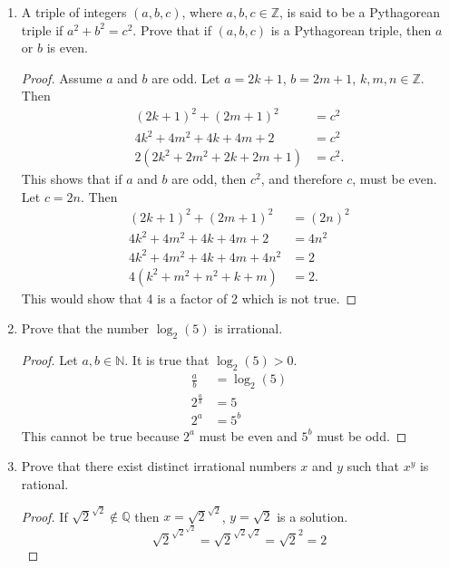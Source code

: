 \documentclass[12pt,a4paper,reqno,parskip=full]{amsart}
\numberwithin{equation}{section}
\theoremstyle{plain}
\theoremstyle{definition}
\begin{document}
\begin{enumerate}
  \item A triple of integers $(a,b,c)$, where $a,b,c\in\mathbb{Z}$, is said to be a Pythagorean triple if $a^2+b^2=c^2$. Prove that if $(a,b,c)$ is a Pythagorean triple, then $a$ or $b$ is even.
        \begin{proof}
          Assume $a$ and $b$ are odd. Let $a = 2k + 1$, $b = 2m + 1$, $k,m,n\in\mathbb{Z}$. Then
          \begin{align*}
            (2k + 1)^2 + (2m + 1)^2      & = c^2 \\
            4k^2 + 4m^2 + 4k + 4m + 2    & = c^2 \\
            2(2k^2 + 2m^2 + 2k + 2m + 1) & = c^2.
          \end{align*}
          This shows that if $a$ and $b$ are odd, then $c^2$, and therefore $c$, must be even. Let $c = 2n$. Then
          \begin{align*}
            (2k + 1)^2 + (2m + 1)^2    & = (2n)^2 \\
            4k^2 + 4m^2 + 4k + 4m + 2  & = 4n^2     \\
            4k^2 + 4m^2 + 4k + 4m + 4n^2 & = 2      \\
            4(k^2 + m^2 + n^2 + k + m)   & = 2.
          \end{align*}
          This would show that 4 is a factor of 2 which is not true.
        \end{proof}

  \item Prove that the number $\log_2(5)$ is irrational.
        \begin{proof}
          Let $a,b\in\mathbb{N}$. It is true that $\log_2(5) > 0$.
          \begin{align*}
            \frac{a}{b}     & =\log_2(5) \\
            2^{\frac{a}{b}} & = 5        \\
            2^a             & = 5^b
          \end{align*}
          This cannot be true because $2^a$ must be even and $5^b$ must be odd.
        \end{proof}

  \item Prove that there exist distinct irrational numbers $x$ and $y$ such that $x^y$ is rational.
        \begin{proof}
          If $\sqrt{2}^{\sqrt{2}}\notin\mathbb{Q}$ then $x = \sqrt{2}^{\sqrt{2}}$, $y = \sqrt{2}$ is a solution.
          \[
            \sqrt{2}^{\sqrt{2}^{\sqrt{2}}} = \sqrt{2}^{\sqrt{2}\sqrt{2}} = \sqrt{2}^2 = 2
          \]


\end{proof}
\end{enumerate}
\end{document}
